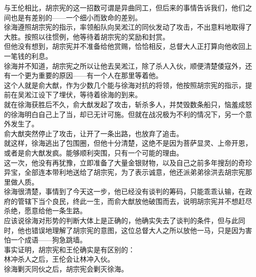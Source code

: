 \begin{multicols}{\theparacolNo}
与王伦相比，胡宗宪的这一招数可谓是异曲同工，但后来的事情告诉我们，他们之间也是有差别的——一个细小而致命的差别。\\

徐海遵照胡宗宪的指示，率领船队向吴淞江的同伙发动了攻击，不出意料地取得了大胜。按照以往惯例，他等待着胡宗宪的奖励和封赏。\\

但他没有想到，胡宗宪并不准备给他赏赐，恰恰相反，总督大人正打算向他收回上一笔钱的利息。\\

徐海并不知道，胡宗宪之所以让他去吴淞江，除了杀人入伙，顺便清楚倭寇外，还有一个更为重要的原因——有一个人在那里等着他。\\

这个人就是俞大猷，作为少数几个能与徐海对抗的将领，他按照胡宗宪的指示，提前在吴淞江设下了埋伏，等待着徐海的到来。\\

就在徐海获胜后不久，俞大猷发起了攻击，斩杀多人，并焚毁数条船只，恼羞成怒的徐海明白自己上了当，却已无计可施。但就在战况极为不利的情况下，另一个意外发生了。\\

俞大猷突然停止了攻击，让开了一条出路，也放弃了追击。\\

就这样，徐海逃出了包围圈，但他十分清楚，这绝不是因为菩萨显灵、上帝开恩，或者是俞大猷发疯。能够顺利突围，只有一个可能的理由。\\

这一次，他没有再犹豫，立即准备了大量金银财物，以及自己之前多年搜刮的奇珍异宝，全部连本带利地送给了胡宗宪，为了表示诚意，他还派弟弟徐洪去胡宗宪那里做人质。\\

徐海很清楚，事情到了今天这一步，他已经没有谈判的筹码，只能乖乖认输，在政府的管辖下当个良民，终此一生，而俞大猷放他破围而去，说明胡宗宪并不想赶尽杀绝，愿意给他一条生路。\\

应该说徐海对形势的判断大体上是正确的，他确实失去了谈判的条件，但与此同时，他也错误地理解了胡宗宪的意图，这位总督大人之所以放他一马，只是因为害怕一个成语——狗急跳墙。\\

事实证明，胡宗宪和王伦确实是有区别的：\\

林冲杀人之后，王伦会让林冲入伙。\\

徐海剿灭同伙之后，胡宗宪会剿灭徐海。\\


\end{multicols}
